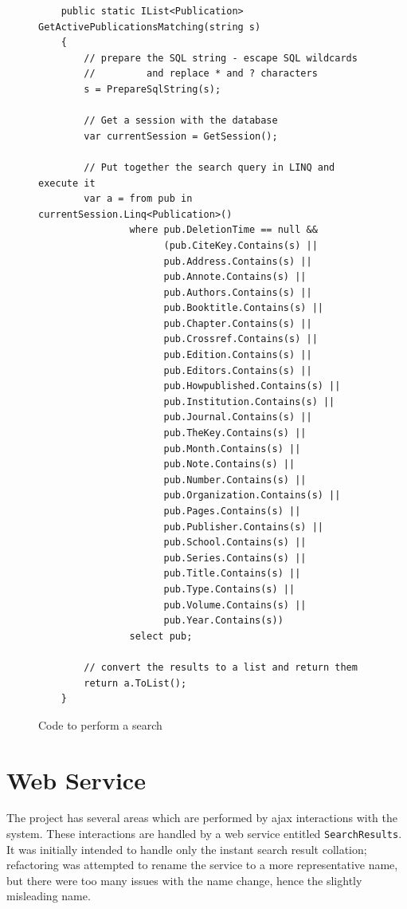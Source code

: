 \begin{figure}
	\begin{center}
			\lstset{language=CSharp} 
			\begin{lstlisting}
	public static IList<Publication> GetActivePublicationsMatching(string s)
	{
	    // prepare the SQL string - escape SQL wildcards 
	    //         and replace * and ? characters
	    s = PrepareSqlString(s);
	    
	    // Get a session with the database
	    var currentSession = GetSession();
	
	    // Put together the search query in LINQ and execute it
	    var a = from pub in currentSession.Linq<Publication>()
	            where pub.DeletionTime == null &&
	                  (pub.CiteKey.Contains(s) ||
	                  pub.Address.Contains(s) ||
	                  pub.Annote.Contains(s) ||
	                  pub.Authors.Contains(s) ||
	                  pub.Booktitle.Contains(s) ||
	                  pub.Chapter.Contains(s) ||
	                  pub.Crossref.Contains(s) ||
	                  pub.Edition.Contains(s) ||
	                  pub.Editors.Contains(s) ||
	                  pub.Howpublished.Contains(s) ||
	                  pub.Institution.Contains(s) ||
	                  pub.Journal.Contains(s) ||
	                  pub.TheKey.Contains(s) ||
	                  pub.Month.Contains(s) ||
	                  pub.Note.Contains(s) ||
	                  pub.Number.Contains(s) ||
	                  pub.Organization.Contains(s) ||
	                  pub.Pages.Contains(s) ||
	                  pub.Publisher.Contains(s) ||
	                  pub.School.Contains(s) ||
	                  pub.Series.Contains(s) ||
	                  pub.Title.Contains(s) ||
	                  pub.Type.Contains(s) ||
	                  pub.Volume.Contains(s) ||
	                  pub.Year.Contains(s))
	            select pub;
	
	    // convert the results to a list and return them
	    return a.ToList();
	}  		
			\end{lstlisting}
		\caption{Code to perform a search}
		\label{fig:PerformSearch}
	\end{center}
\end{figure}


\section{Web Service}
\label{webService}
The project has several areas which are performed by \gls{ajax} interactions with the system.  These interactions are handled by a web service entitled \texttt{SearchResults}. It was initially intended to handle only the instant search result collation; refactoring was attempted to rename the service to a more representative name, but there were too many issues with the name change, hence the slightly misleading name.

